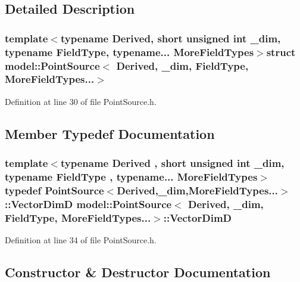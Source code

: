 \subsection{Detailed Description}
\subsubsection*{template$<$typename Derived, short unsigned int \+\_\+dim, typename Field\+Type, typename... More\+Field\+Types$>$struct model\+::\+Point\+Source$<$ Derived, \+\_\+dim, Field\+Type, More\+Field\+Types...$>$}



Definition at line 30 of file Point\+Source.\+h.



\subsection{Member Typedef Documentation}
\hypertarget{structmodel_1_1_point_source_3_01_derived_00_01__dim_00_01_field_type_00_01_more_field_types_8_8_8_4_a310517b29a0ce279fd5d968c40564f20}{}
\subsubsection[{Vector\+Dim\+D}]{\setlength{\rightskip}{0pt plus 5cm}template$<$typename Derived , short unsigned int \+\_\+dim, typename Field\+Type , typename... More\+Field\+Types$>$ typedef {\bf Point\+Source}$<$Derived,\+\_\+dim,More\+Field\+Types...$>$\+::{\bf Vector\+Dim\+D} {\bf model\+::\+Point\+Source}$<$ Derived, \+\_\+dim, Field\+Type, More\+Field\+Types...$>$\+::{\bf Vector\+Dim\+D}}\label{structmodel_1_1_point_source_3_01_derived_00_01__dim_00_01_field_type_00_01_more_field_types_8_8_8_4_a310517b29a0ce279fd5d968c40564f20}


Definition at line 34 of file Point\+Source.\+h.



\subsection{Constructor \& Destructor Documentation}
\hypertarget{structmodel_1_1_point_source_3_01_derived_00_01__dim_00_01_field_type_00_01_more_field_types_8_8_8_4_ac9c2e293d8186accb28a63965c8adf20}{}
